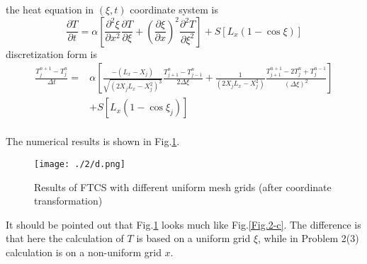 \documentclass[12pt,a4paper]{article} %
\begin{document}
\begin{CJK}{UTF8}{song}
the heat equation in $(\xi, t)$ coordinate system is
\begin{equation}
\frac{\partial T}{\partial t}=\alpha [\frac{\partial ^{2}\xi}{\partial x^{2}}\frac{\partial T}{\partial \xi}+(\frac{\partial \xi}{\partial x})^{2}\frac{\partial ^{2}T}{\partial \xi^{2}}]+S[L_{x}(1-\cos \xi)]
\end{equation}
discretization form is
\begin{equation}
    \begin{split}
\frac{T_{j}^{n+1}-T_{j}^{n}}{\Delta t}= & \alpha[\frac{-(L_{x}-X_{j})}{\sqrt{(2X_{j} L_{x}-X_{j}^{2})^{3}}}
\frac{T_{j+1}^{n}-T_{j-1}^{n}}{2\Delta \xi}+
\frac{1}{(2X_{j} L_{x}-X_{j}^{2})}\frac{T_{j+1}^{n+1}-2T_{j}^{n}+T_{j}^{n-1}}{(\Delta \xi)^{2}}
]  \\
&    +S[L_{x}(1-\cos \xi_{j})] \\
    \end{split}
\end{equation}

The numerical results is shown in Fig.\ref{Fig.2-d}.
\begin{figure}[htbp]
\centering
{
    \texttt{[image: ./2/d.png]}
}
\caption{Results of FTCS with different uniform mesh grids (after coordinate transformation)} \label{Fig.2-d}
\end{figure}
It should be pointed out that Fig.\ref{Fig.2-d} looks much like Fig.\ref{Fig.2-c}.
The difference is that here the calculation of $T$ is based on a uniform grid $\xi$,
while in Problem 2(3) calculation is on a non-uniform grid $x$.


\end{CJK}
\end{document}
